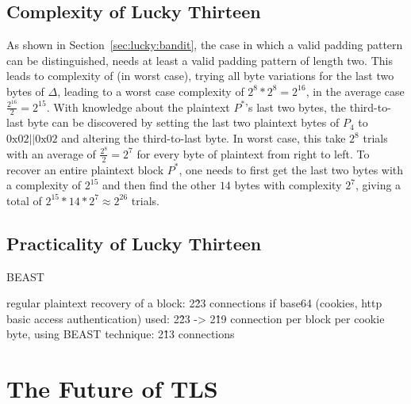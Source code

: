 \documentclass[10pt,conference,a4paper]{IEEEtran}
\begin{document}
\subsection{Complexity of Lucky Thirteen}
\label{sec:lucky:complexity}
As shown in Section~\ref{sec:lucky:bandit}, the case in which a valid padding pattern can be distinguished, needs at least a valid padding pattern of length two. This leads to complexity of (in worst case), trying all byte variations for the last two bytes of $\Delta$, leading to a worst case complexity of $2^8*2^8 = 2^{16}$, in the average case $\frac{2^{16}}{2} = 2^{15}$. With knowledge about the plaintext $P^{*}$'s last two bytes, the third-to-last byte can be discovered by setting the last two plaintext bytes of $P_4$ to $0\text{x}02||0\text{x}02$ and altering the third-to-last byte. In worst case, this take $2^8$ trials with an average of $\frac{2^8}{2} = 2^7$ for every byte of plaintext from right to left. To recover an entire plaintext block $P^{*}$, one needs to first get the last two bytes with a complexity of $2^{15}$ and then find the other $14$ bytes with complexity $2^7$, giving a total of $2^{15} * 14 * 2^7 \approx 2^{26}$ trials.

\subsection{Practicality of Lucky Thirteen}
\label{sec:lucky:practicality}


BEAST~\cite{duong2011here}



regular plaintext recovery of a block: 2\^23 connections
if base64 (cookies, http basic access authentication) used: 2\^23 -> 2\^19 connection per block
per cookie byte, using BEAST technique: 2\^13 connections



\section{The Future of TLS}
\label{sec:future}




%

\end{document}
